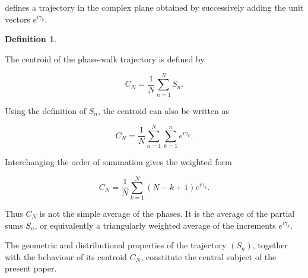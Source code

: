 \documentclass[11pt]{amsart}
\numberwithin{equation}{section}
\theoremstyle{plain}
\theoremstyle{definition}
\newtheorem{definition}[theorem]{Definition}
\theoremstyle{remark}
\begin{document}
defines a trajectory in the complex plane obtained by successively
adding the unit vectors
\(e^{i\gamma_k}\).

\begin{definition}
\label{def:CN}

The centroid of the phase-walk trajectory is defined by

\begin{equation}
C_N
=
\frac{1}{N}
\sum_{n=1}^{N}
S_n.
\label{eq:CN_definition}
\end{equation}

\end{definition}

Using the definition of \(S_n\), the centroid can also be written as

\begin{equation}
C_N
=
\frac{1}{N}
\sum_{n=1}^{N}
\sum_{k=1}^{n}
e^{i\gamma_k}.
\label{eq:CN_double_sum}
\end{equation}

Interchanging the order of summation gives the weighted form

\begin{equation}
C_N
=
\frac{1}{N}
\sum_{k=1}^{N}
(N-k+1)e^{i\gamma_k}.
\label{eq:CN_weighted}
\end{equation}

Thus \(C_N\) is not the simple average of the phases.
It is the average of the partial sums \(S_n\), or equivalently a
triangularly weighted average of the increments \(e^{i\gamma_k}\).

The geometric and distributional properties of the trajectory
\((S_n)\), together with the behaviour of its centroid \(C_N\),
constitute the central subject of the present paper.
\end{document}
